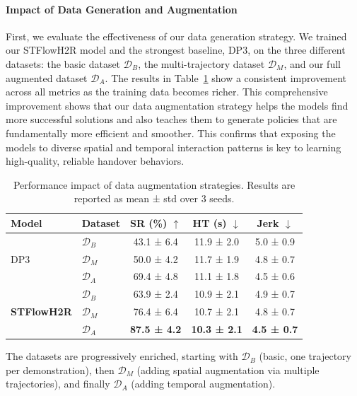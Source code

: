 \documentclass[final,5p,times,twocolumn]{elsarticle}
\begin{document}
\paragraph{Impact of Data Generation and Augmentation}
First, we evaluate the effectiveness of our data generation strategy. We trained our STFlowH2R model and the strongest baseline, DP3, on the three different datasets: the basic dataset $\mathcal{D}_B$, the multi-trajectory dataset $\mathcal{D}_M$, and our full augmented dataset $\mathcal{D}_A$. The results in Table~\ref{data_ablation} show a consistent improvement across all metrics as the training data becomes richer. This comprehensive improvement shows that our data augmentation strategy helps the models find more successful solutions and also teaches them to generate policies that are fundamentally more efficient and smoother. This confirms that exposing the models to diverse spatial and temporal interaction patterns is key to learning high-quality, reliable handover behaviors.


\begin{table}[htbp]
\footnotesize
\centering
\caption{Performance impact of data augmentation strategies. Results are reported as mean ± std over 3 seeds.}
\label{data_ablation}
\begin{threeparttable}
\begin{tabular}{llccc}
\toprule
\textbf{Model} & \textbf{Dataset} & \textbf{SR (\%)} $\uparrow$ & \textbf{HT (s)} $\downarrow$ & \textbf{Jerk} $\downarrow$ \\
\midrule
\multirow{3}{*}{DP3} 
& $\mathcal{D}_B$ & 43.1 ± 6.4 & 11.9 ± 2.0 & 5.0 ± 0.9 \\
& $\mathcal{D}_M$ & 50.0 ± 4.2 & 11.7 ± 1.9 & 4.8 ± 0.7 \\
& $\mathcal{D}_A$ & 69.4 ± 4.8 & 11.1 ± 1.8 & 4.5 ± 0.6 \\
\midrule
\multirow{3}{*}{\textbf{STFlowH2R}} 
& $\mathcal{D}_B$ & 63.9 ± 2.4 & 10.9 ± 2.1 & 4.9 ± 0.7 \\
& $\mathcal{D}_M$ & 76.4 ± 6.4 & 10.7 ± 2.1 & 4.8 ± 0.7 \\
& $\mathcal{D}_A$ & \textbf{87.5 ± 4.2} & \textbf{10.3 ± 2.1} & \textbf{4.5 ± 0.7} \\
\bottomrule
\end{tabular}
\begin{tablenotes}
\item[*] The datasets are progressively enriched, starting with $\mathcal{D}_B$ (basic, one trajectory per demonstration), then $\mathcal{D}_M$ (adding spatial augmentation via multiple trajectories), and finally $\mathcal{D}_A$ (adding temporal augmentation).
\end{tablenotes}
\end{threeparttable}
\end{table}
\end{document}
